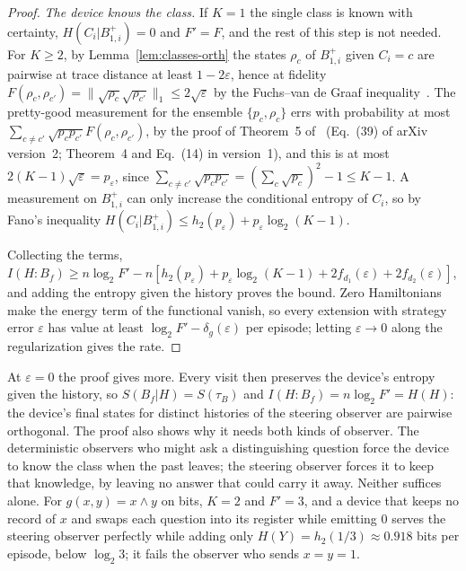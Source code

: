 \begin{proof}
\emph{The device knows the class.} If $K=1$ the single class is known with certainty, $H(C_i|B^+_{1,i})=0$ and $F'=F$, and the rest of this step is not needed. For $K\ge2$, by Lemma~\ref{lem:classes-orth} the states $\rho_c$ of $B^+_{1,i}$ given $C_i=c$ are pairwise at trace distance at least $1-2\varepsilon$, hence at fidelity $F(\rho_c,\rho_{c'})=\|\sqrt{\rho_c}\sqrt{\rho_{c'}}\|_1\le2\sqrt\varepsilon$ by the Fuchs--van de Graaf inequality~\cite{FuchsvandeGraaf99}. The pretty-good measurement for the ensemble $\{p_c,\rho_c\}$ errs with probability at most $\sum_{c\ne c'}\sqrt{p_cp_{c'}}F(\rho_c,\rho_{c'})$, by the proof of Theorem~5 of~\cite{BarnumKnill02} (Eq.~(39) of arXiv version~2; Theorem~4 and Eq.~(14) in version~1), and this is at most $2(K-1)\sqrt\varepsilon=p_\varepsilon$, since $\sum_{c\ne c'}\sqrt{p_cp_{c'}}=(\sum_c\sqrt{p_c})^2-1\le K-1$. A measurement on $B^+_{1,i}$ can only increase the conditional entropy of $C_i$, so by Fano's inequality $H(C_i|B^+_{1,i})\le h_2(p_\varepsilon)+p_\varepsilon\log_2(K-1)$.

Collecting the terms, $I(H{:}B_f)\ge n\log_2F'-n[h_2(p_\varepsilon)+p_\varepsilon\log_2(K-1)+2f_{d_1}(\varepsilon)+2f_{d_2}(\varepsilon)]$, and adding the entropy given the history proves the bound. Zero Hamiltonians make the energy term of the functional vanish, so every extension with strategy error $\varepsilon$ has value at least $\log_2F'-\delta_g(\varepsilon)$ per episode; letting $\varepsilon\to0$ along the regularization gives the rate.
\end{proof}

At $\varepsilon=0$ the proof gives more. Every visit then preserves the device's entropy given the history, so $S(B_f|H)=S(\tau_B)$ and $I(H{:}B_f)=n\log_2F'=H(H)$: the device's final states for distinct histories of the steering observer are pairwise orthogonal. The proof also shows why it needs both kinds of observer. The deterministic observers who might ask a distinguishing question force the device to know the class when the past leaves; the steering observer forces it to keep that knowledge, by leaving no answer that could carry it away. Neither suffices alone. For $g(x,y)=x\wedge y$ on bits, $K=2$ and $F'=3$, and a device that keeps no record of $x$ and swaps each question into its register while emitting $0$ serves the steering observer perfectly while adding only $H(Y)=h_2(1/3)\approx0.918$ bits per episode, below $\log_2 3$; it fails the observer who sends $x=y=1$.

